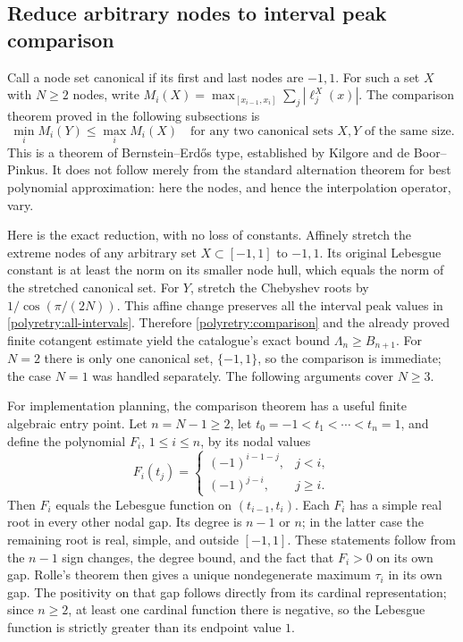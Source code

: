 \documentclass[11pt]{article}
\theoremstyle{remark}
\numberwithin{equation}{section}
\begin{document}
\subsection{Reduce arbitrary nodes to interval peak comparison}

Call a node set canonical if its first and last nodes are $-1,1$.
For such a set $X$ with $N\ge2$ nodes, write
$M_i(X)=\max_{[x_{i-1},x_i]}\sum_j|\ell_j^X(x)|$.
The comparison theorem proved in the following subsections is
\begin{equation}\label{polyretry:comparison}
 \min_i M_i(Y)\le\max_i M_i(X)
 \quad\text{for any two canonical sets $X,Y$ of the same size.}
\end{equation}
This is a theorem of Bernstein--Erd\H{o}s type, established by
Kilgore and de Boor--Pinkus.  It does not follow merely from the standard
alternation theorem for best polynomial approximation: here the nodes,
and hence the interpolation operator, vary.

Here is the exact reduction, with no loss of constants.  Affinely
stretch the extreme nodes of any arbitrary set $X\subset[-1,1]$ to
$-1,1$.  Its original Lebesgue constant is at least the norm on its
smaller node hull, which equals the norm of the stretched canonical
set.  For $Y$, stretch the Chebyshev roots by
$1/\cos(\pi/(2N))$.  This affine change preserves all the interval
peak values in \eqref{polyretry:all-intervals}.  Therefore
\eqref{polyretry:comparison} and the already proved finite cotangent
estimate yield the catalogue's exact bound $\Lambda_n\ge B_{n+1}$.
For $N=2$ there is only one canonical set, $\{-1,1\}$, so the
comparison is immediate; the case $N=1$ was handled separately.
The following arguments cover $N\ge3$.

For implementation planning, the comparison theorem has a useful
finite algebraic entry point.  Let $n=N-1\ge2$, let
$t_0=-1<t_1<\cdots<t_n=1$, and define the polynomial $F_i$,
$1\le i\le n$, by its nodal values
\[
 F_i(t_j)=
 \begin{cases}(-1)^{i-1-j},&j<i,\\(-1)^{j-i},&j\ge i.\end{cases}
\]
Then $F_i$ equals the Lebesgue function on $(t_{i-1},t_i)$.
Each $F_i$ has a simple real root in every other nodal gap.  Its
degree is $n-1$ or $n$; in the latter case the remaining root is
real, simple, and outside $[-1,1]$.  These statements follow from
the $n-1$ sign changes, the degree bound, and the fact that $F_i>0$
on its own gap.  Rolle's theorem then gives a unique nondegenerate
maximum $\tau_i$ in its own gap.  The positivity on that gap follows
directly from its cardinal representation; since $n\ge2$, at least
one cardinal function there is negative, so the Lebesgue function
is strictly greater than its endpoint value $1$.
\end{document}

